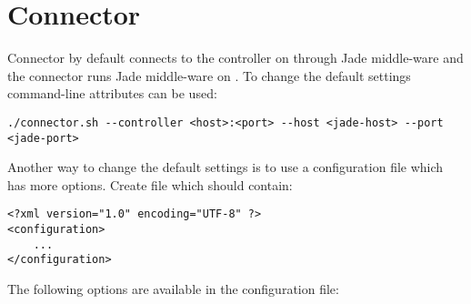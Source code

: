\section{Connector}
Connector by default connects to the controller on  through Jade middle-ware and the connector runs Jade middle-ware on . To change the default settings command-line attributes can be used:
\begin{verbatim}
./connector.sh --controller <host>:<port> --host <jade-host> --port <jade-port>
\end{verbatim}
Another way to change the default settings is to use a configuration file which has more options. Create file  which should contain:
\begin{verbatim}
<?xml version="1.0" encoding="UTF-8" ?>
<configuration>
    ...
</configuration>
\end{verbatim}
The following options are available in the configuration file:
